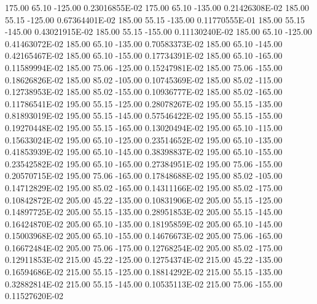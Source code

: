      175.00      65.10    -125.00      0.23016855E-02
     175.00      65.10    -135.00      0.21426308E-02
     185.00      55.15    -125.00      0.67364401E-02
     185.00      55.15    -135.00      0.11770555E-01
     185.00      55.15    -145.00      0.43021915E-02
     185.00      55.15    -155.00      0.11130240E-02
     185.00      65.10    -125.00      0.41463072E-02
     185.00      65.10    -135.00      0.70583373E-02
     185.00      65.10    -145.00      0.42165467E-02
     185.00      65.10    -155.00      0.17734391E-02
     185.00      65.10    -165.00      0.11589994E-02
     185.00      75.06    -125.00      0.15247981E-02
     185.00      75.06    -155.00      0.18626826E-02
     185.00      85.02    -105.00      0.10745369E-02
     185.00      85.02    -115.00      0.12738953E-02
     185.00      85.02    -155.00      0.10936777E-02
     185.00      85.02    -165.00      0.11786541E-02
     195.00      55.15    -125.00      0.28078267E-02
     195.00      55.15    -135.00      0.81893019E-02
     195.00      55.15    -145.00      0.57546422E-02
     195.00      55.15    -155.00      0.19270448E-02
     195.00      55.15    -165.00      0.13020494E-02
     195.00      65.10    -115.00      0.15633024E-02
     195.00      65.10    -125.00      0.23514652E-02
     195.00      65.10    -135.00      0.41853939E-02
     195.00      65.10    -145.00      0.38398837E-02
     195.00      65.10    -155.00      0.23542582E-02
     195.00      65.10    -165.00      0.27384951E-02
     195.00      75.06    -155.00      0.20570715E-02
     195.00      75.06    -165.00      0.17848688E-02
     195.00      85.02    -105.00      0.14712829E-02
     195.00      85.02    -165.00      0.14311166E-02
     195.00      85.02    -175.00      0.10842872E-02
     205.00      45.22    -135.00      0.10831906E-02
     205.00      55.15    -125.00      0.14897725E-02
     205.00      55.15    -135.00      0.28951853E-02
     205.00      55.15    -145.00      0.16424870E-02
     205.00      65.10    -135.00      0.18195859E-02
     205.00      65.10    -145.00      0.15003968E-02
     205.00      65.10    -155.00      0.14676673E-02
     205.00      75.06    -165.00      0.16672484E-02
     205.00      75.06    -175.00      0.12768254E-02
     205.00      85.02    -175.00      0.12911853E-02
     215.00      45.22    -125.00      0.12754374E-02
     215.00      45.22    -135.00      0.16594686E-02
     215.00      55.15    -125.00      0.18814292E-02
     215.00      55.15    -135.00      0.32882814E-02
     215.00      55.15    -145.00      0.10535113E-02
     215.00      75.06    -155.00      0.11527620E-02
